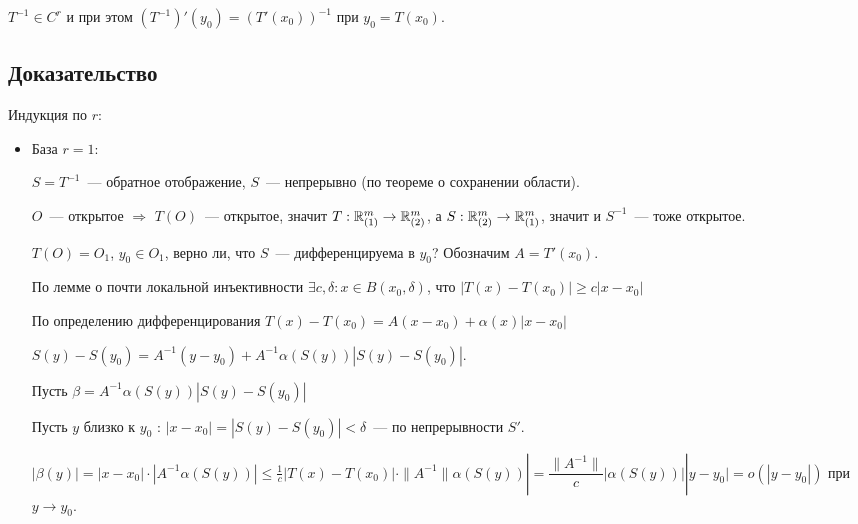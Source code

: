 \documentclass{article}
\begin{document}
        $T^{-1} \in C^r$ и при этом $\left( T^{-1} \right)'(y_0) = \left( T'(x_0) \right)^{-1}$ при $y_0 = T(x_0)$.
        
        \subsection{Доказательство}
        
            Индукция по $r$:
            
            \begin{itemize}
            
                \item База $r = 1$:
                
                    $S = T^{-1}$~--- обратное отображение, $S$~--- непрерывно (по теореме о сохранении области).
                    
                    $O$~--- открытое $\Rightarrow$ $T(O)$~--- открытое, значит $T: \mathbb{R}^m_{(1)} \rightarrow \mathbb{R}^m_{(2)}$, а $S : \mathbb{R}^m_{(2)} \rightarrow \mathbb{R}^m_{(1)}$, значит и $S^{-1}$~--- тоже открытое.
                    
                    $T(O) = O_1$, $y_0 \in O_1$, верно ли, что $S$~--- дифференцируема в $y_0$? Обозначим $A = T'(x_0)$.
                    
                    По лемме о почти локальной инъективности $\exists c, \delta : x \in B(x_0, \delta)$, что $\left| T(x) - T(x_0) \right| \geq c | x - x_0 |$
                    
                    По определению дифференцирования $T(x) - T(x_0) = A(x - x_0) + \alpha(x) | x - x_0 |$
                    
                    $S(y) - S(y_0) = A^{-1} (y - y_0) + A^{-1} \alpha \left( S(y) \right) \left| S(y) - S(y_0) \right|$.
                    
                    Пусть $\beta = A^{-1} \alpha \left( S(y) \right) \left| S(y) - S(y_0) \right|$
                    
                    Пусть $y$ близко к $y_0$ : $| x - x_0 | = \left| S(y) - S(y_0) \right| < \delta$~--- по непрерывности $S'$.
                    
                    $| \beta(y) | = |x - x_0| \cdot \left| A^{-1} \alpha \left( S(y) \right) \right| \leq \frac{1}{c} \left| T(x) - T(x_0) \right| \cdot \| A^{-1} \| \alpha \left( S(y) \right) | = \dfrac{\| A^{-1} \|}{c} \left| \alpha \left( S(y) \right) \right| |y - y_0| = o(|y - y_0|)$ при $y \rightarrow y_0$.
                    

\end{itemize}
\end{document}
